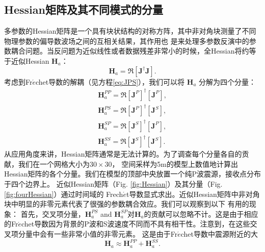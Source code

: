 \subsection{Hessian矩阵及其不同模式的分量}
多参数的Hessian矩阵是一个具有块状结构的对称方阵，其中非对角块测量了不同物理参数的偏导数波场之间的互相关结果，其作用也
是来处理多参数反演中的参数耦合问题。当反问题为近似线性或者数据残差非常小的时候，全Hessian将约等于近似Hessian
$\mathbf{H}_a$\cite[]{pratt1998gauss}：
\begin{equation}
\mathbf{H}_a =\mathfrak{R}[{\mathbf{J}}^{\dagger}\mathbf{J}]. 
\label{eq:hess}
\end{equation}
考虑到Fr{$\acute{e}$}chet导数的解耦（见方程\ref{eq:JPS}），我们可以将 $\mathbf{H}_a$ 分解为四个分量：
\begin{equation}
\begin{split}
\mathbf{H}_a^{PP}=\mathfrak{R}[{\mathbf{J}^{P}}]^{\dagger}[{\mathbf{J}^{P}}],\\
\mathbf{H}_a^{PS}=\mathfrak{R}[{\mathbf{J}^{P}}]^{\dagger}[{\mathbf{J}^{S}}],\\
\mathbf{H}_a^{SP}=\mathfrak{R}[{\mathbf{J}^{S}}]^{\dagger}[{\mathbf{J}^{P}}],\\
\mathbf{H}_a^{SS}=\mathfrak{R}[{\mathbf{J}^{S}}]^{\dagger}[{\mathbf{J}^{S}}].
\end{split}
\label{eq:hessian_component}
\end{equation}
从应用角度来讲，Hessian矩阵通常是无法计算的。为了调查每个分量各自的贡献，我们在一个网格大小为$30\times30$，
空间采样为5m的模型上数值地计算出Hessian矩阵的各个分量。我们在模型的顶部中央放置一个纯P波震源，接收点分布于四个边界上。
近似Hessian矩阵（Fig. \ref{fig:Hessian}）及其分量（Fig. \ref{fig:fourHessian}）通过时间域的 Frech{$\acute{e}$}t导数显式求出。近似Hessian矩阵中非对角块中明显的非零元素代表了很强的参数耦合效应。我们可以观察到以下
有用的现象：
首先，交叉项分量，$\mathbf{H}_a^{PS}$ and $\mathbf{H}_a^{SP}$对$\mathbf{H}_a$的贡献可以忽略不计。这是由于相应
的Fr{$\acute{e}$}chet导数因为背景的P波和S波速度不同而不具有相干性。注意到，在这些交叉项分量中会有一些非常小值的非零元素。
这是由于Fr{$\acute{e}$}chet导数中震源附近的大
\begin{equation}
        \mathbf{H}_a\approx
        \mathbf{H}_a^{PP}+
        \mathbf{H}_a^{SS}.
        \label{eq:C3}
\end{equation}
